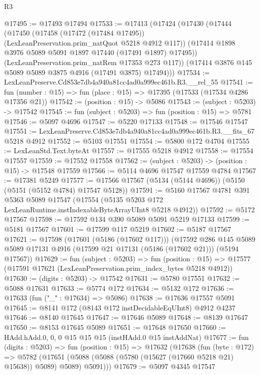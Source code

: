 \begin{lexlean}{R3}
\begin{coremodule}
@17495 := @17493 @17494
@17533 := @17413
    (@17424
      (@17430
        (@17444
          (@17450
            (@17458 (@17472 (@17484 @17495)) (LexLeanPreservation.prim_natQuot @5218 @4912 @117))
            (@17414 @1898 @3976 @5089 @5091 @1897 @17440 (@17491 @1897) @17495))
          (LexLeanPreservation.prim_natRem @17353 @273 @117))
        (@17414 @3876 @145 @5089 @5089 @3875 @4916 (@17491 @3875) @17494)))
@17534 := LexLeanPreserve.Cd853e7db4a940a81cc4ad0a999ec461b.R3.__rel_55
@17541 := fun (number : @15) => fun (place : @15) => @17395 (@17533 (@17534 @4286 @17356 @21))
@17542 := (position : @15) -> @5086
@17543 := (subject : @5203) -> @17542
@17545 := fun (subject : @5203) => fun (position : @15) => @5781
@17546 := @5097 @4696
@17547 := @5220 @17133
@17548 := @17546 @17547
@17551 := LexLeanPreserve.Cd853e7db4a940a81cc4ad0a999ec461b.R3.__fits_67 @5218 @4912
@17552 := @5103 @17551
@17554 := @5800 @172 @4704
@17555 := LexLeanStd.Text.byteAt
@17557 := @17555 @5218 @4912
@17558 := @17554 @17557
@17559 := @17552 @17558
@17562 := (subject : @5203) -> (position : @15) -> @17548 @17559
@17566 := @5114 @4696 @17547 @17559 @4784
@17567 := @17381 @5249
@17577 := @17566 @17567 (@5134 (@5144 @4696)) (@5150 (@5151 (@5152 @4784) @17547 @5128))
@17591 := @5160
    @17567
    @4781
    @391
    @5363
    @5089
    @17547
    (@17554 (@5135 @5203 @172 LexLeanRuntime.instIndexableByteArrayUInt8 @5218 @4912))
@17592 := @5172 @17567
@17598 := @17592 @134 @390 @5089 @5091 @5219 @17133
@17599 := @5181 @17567
@17601 := @17599 @117 @5219
@17602 := @5187 @17567
@17621 := @17598
    (@17601 (@5186 (@17602 @117)))
    (@17592
      @286
      @145
      @5089
      @5089
      @17131
      @4916
      (@17599 @21 @17131 (@5186 (@17602 @21)))
      (@5194 @17567))
@17629 := fun (subject : @5203) =>
  fun (position : @15) => @17577 (@17591 @17621 (LexLeanPreservation.prim_index_bytes @5218 @4912))
@17630 := (digits : @5203) -> @17542
@17631 := @5780 @17551
@17632 := @5088 @17631
@17633 := @5774 @172
@17634 := @5132 @172
@17636 := @17633 (fun ("_" : @17634) => @5086)
@17638 := @17636 @17557 @5091
@17645 := @8141 @172 (@8143 @172 instDecidableEqUInt8) @4912 @4237
@17646 := @8140 @17645
@17647 := @17646 @5089
@17648 := @8139 @17647
@17650 := @8153 @17645 @5089
@17651 := @17648 @17650
@17660 := HAdd.hAdd.{0, 0, 0} @15 @15 @15 (instHAdd.{0} @15 instAddNat)
@17677 := fun (digits : @5203) =>
  fun (position : @15) =>
  @17632
    (@17638
      (fun (byte : @172) =>
      @5782 (@17651 (@5088 (@5088 (@5780 (@15627 (@17660 @5218 @21) @15638)) @5089) @5089) @5091)))
@17679 := @5097 @4345 @17547

\end{coremodule}
\end{lexlean}
